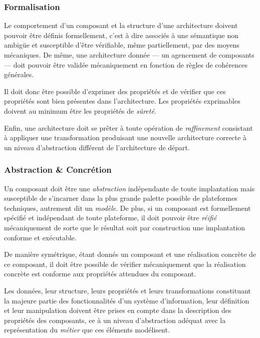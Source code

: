 \subsubsection{Formalisation}

Le comportement d'un composant et la structure d'une architecture
doivent pouvoir \^etre d\'efinis formellement, c'est \`a dire
associ\'es \`a une s\'emantique non ambig\"ue et susceptible
d'\^etre v\'erifiable, m\^eme partiellement, par des moyens
m\'ecaniques. 
De m\^eme, une architecture donn\'ee --- un agencement de composants --- doit
pouvoir \^etre valid\'ee m\'ecaniquement en fonction de r\`egles
de coh\'erences g\'en\'erales. 

Il doit donc \^etre possible d'exprimer des propri\'et\'es et de
v\'erifier que ces propri\'et\'es sont bien pr\'esentes dans
l'architecture. Les propri\'et\'es exprimables doivent au minimum
\^etre les propri\'et\'es de \emph{s\^uret\'e}. 

Enfin, une architecture doit se pr\^eter \`a toute op\'eration de
\emph{raffinement} consistant \`a appliquer une transformation
produisant une nouvelle architecture correcte \`a un niveau
d'abstraction diff\'erent de l'architecture de d\'epart.

\subsubsection{Abstraction \& Concr\'etion}

Un composant doit \^etre une \emph{abstraction} ind\'ependante de toute
implantation mais susceptible de s'incarner dans la plus grande
palette possible de plateformes techniques, autrement dit un \emph{mod\`ele}. 
De plus, si un composant
est formellement sp\'ecifi\'e et ind\'ependant de toute plateforme,
il doit pouvoir \^etre \emph{r\'eifi\'e} m\'ecaniquement de sorte
que le r\'esultat soit par construction une implantation conforme et
ex\'ecutable.

De mani\`ere sym\'etrique, \'etant donn\'es un composant et une r\'ealisation concr\`ete
de ce composant, il doit \^etre possible de v\'erifier
m\'ecaniquement que la r\'ealisation concr\`ete est conforme aux propri\'et\'es
attendues du composant. 

Les donn\'ees, leur structure, leurs propri\'et\'es  et leurs
transformations constituant la majeure partie des fonctionnalit\'es
d'un syst\`eme d'information, leur d\'efinition et leur manipulation
doivent \^etre prises en compte dans la description des propri\'et\'es
des composants, ce \`a un niveau d'abstraction ad\'equat avec la
repr\'esentation du \emph{m\'etier} que ces \'el\'ements mod\'elisent.

